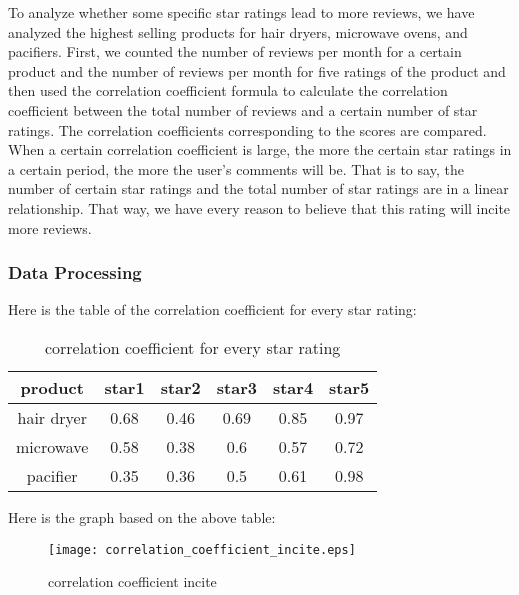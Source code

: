 \documentclass{mcmthesis}
\begin{document}
	To analyze whether some specific star ratings lead to more reviews, we have analyzed the highest selling products for hair dryers, microwave ovens, and pacifiers. First, we counted the number of reviews per month for a certain product and the number of reviews per month for five ratings of the product and then used the correlation coefficient formula to calculate the correlation coefficient between the total number of reviews and a certain number of star ratings. The correlation coefficients corresponding to the scores are compared. When a certain correlation coefficient is large, the more the certain star ratings in a certain period, the more the user's comments will be. That is to say, the number of certain star ratings and the total number of star ratings are in a linear relationship. That way, we have every reason to believe that this rating will incite more reviews.
	
	\subsubsection{Data Processing}
	
	Here is the table of the correlation coefficient for every star rating:
	
	\begin{table}[H]
		\centering
		\caption{correlation coefficient for every star rating}
		\resizebox{120mm}{15mm}
		{%
			\begin{tabular}{|c|c|c|c|c|c|}
				\hline
				product    & star1 & star2 & star3 & star4 & star5 \\ \hline
				hair dryer & 0.68  & 0.46  & 0.69  & 0.85  & 0.97  \\ \hline
				microwave  & 0.58  & 0.38  & 0.6   & 0.57  & 0.72  \\ \hline
				pacifier   & 0.35  & 0.36  & 0.5   & 0.61  & 0.98  \\ \hline
			\end{tabular}%
		}
	\end{table}
	
	Here is the graph based on the above table:
	
	\begin{figure}[H]
		\small
		\centering
		\texttt{[image: correlation\_coefficient\_incite.eps]}
		\caption{correlation coefficient incite} \label{fig:correlation coefficient incite}
	\end{figure}
	
\end{document}
